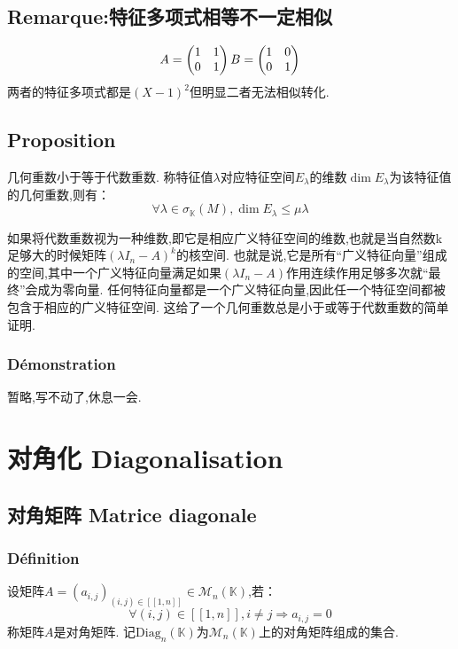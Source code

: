 \documentclass[12pt, a4paper, oneside]{ctexbook}
\begin{document}
  \subsection{Remarque:特征多项式相等不一定相似}
  
  \begin{equation}
    \notag
    A=\begin{pmatrix} 1 & 1 \\ 0 & 1 \end{pmatrix}
    B=\begin{pmatrix} 1 & 0 \\ 0 & 1 \end{pmatrix}
  \end{equation}
  两者的特征多项式都是$(X-1)^2$但明显二者无法相似转化.
  \subsection{Proposition}
  几何重数小于等于代数重数.
  称特征值$\lambda$对应特征空间$E_\lambda$的维数$\dim E_\lambda$为该特征值的几何重数,则有：
  $$
    \forall\lambda\in\sigma_{\mathbb{K}}(M), \dim E_\lambda\leq\mu\lambda
  $$


  如果将代数重数视为一种维数,即它是相应广义特征空间的维数,也就是当自然数k足够大的时候矩阵$(\lambda I_n-A)^k$的核空间.
  也就是说,它是所有“广义特征向量”组成的空间,其中一个广义特征向量满足如果$(\lambda I_n-A)$作用连续作用足够多次就“最终”会成为零向量.
  任何特征向量都是一个广义特征向量,因此任一个特征空间都被包含于相应的广义特征空间.
  这给了一个几何重数总是小于或等于代数重数的简单证明.
  \subsubsection{Démonstration}
  暂略,写不动了,休息一会.
\section{对角化 Diagonalisation}
  \subsection{对角矩阵 Matrice diagonale}
  \subsubsection{Définition}
  设矩阵$A=(a_{i,j})_{(i,j)\in[\![1,n]\!]}\in\mathcal{M}_n(\mathbb{K})$,若：
  $$
    \forall(i,j)\in[\![1,n]\!], i\neq j\Rightarrow a_{i,j}=0
  $$
  称矩阵$A$是对角矩阵.
  记$\mbox{Diag}_n(\mathbb{K})$为$\mathcal{M}_n(\mathbb{K})$上的对角矩阵组成的集合.
\end{document}
